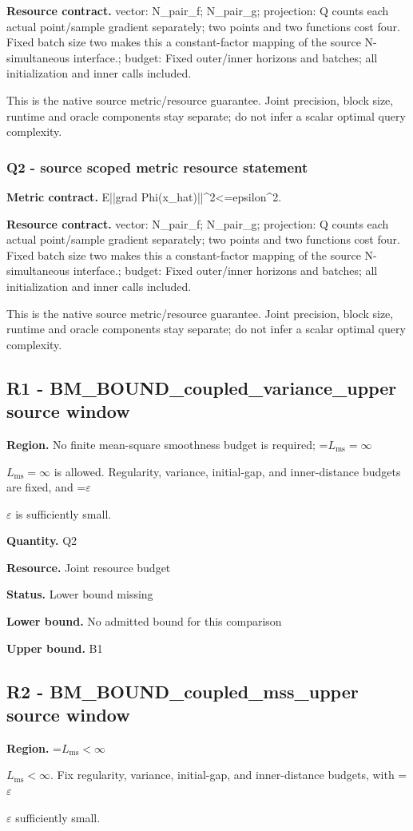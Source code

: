 \documentclass[10pt,a4paper]{article}
\newcommand{\AtlasMath}[1]{\par\begingroup\centering\setbox0=\hbox{$\displaystyle #1$}\ifdim\wd0>1.4\linewidth\typeout{ATLAS WIDE FORMULA: \the\wd0}\fi\ifdim\wd0>\linewidth\resizebox{\linewidth}{!}{\box0}\else\box0\fi\par\endgroup}
\newcommand{\AtlasInlineMath}[1]{\begingroup\setbox0=\hbox{$#1$}\ifdim\wd0>.4\linewidth\endgroup\AtlasMath{#1}\else\endgroup$#1$\fi}
\begin{document}
\textbf{Resource contract.} vector: N\_pair\_f; N\_pair\_g; projection: Q counts each actual point/sample gradient separately; two points and two functions cost four. Fixed batch size two makes this a constant-factor mapping of the source N-simultaneous interface.; budget: Fixed outer/inner horizons and batches; all initialization and inner calls included.

This is the native source metric/resource guarantee. Joint precision, block size, runtime and oracle components stay separate; do not infer a scalar optimal query complexity.

\subsubsection{Q2 - source scoped metric resource statement}
\textbf{Metric contract.} E||grad Phi(x\_hat)||\textasciicircum{}2<=epsilon\textasciicircum{}2.

\textbf{Resource contract.} vector: N\_pair\_f; N\_pair\_g; projection: Q counts each actual point/sample gradient separately; two points and two functions cost four. Fixed batch size two makes this a constant-factor mapping of the source N-simultaneous interface.; budget: Fixed outer/inner horizons and batches; all initialization and inner calls included.

This is the native source metric/resource guarantee. Joint precision, block size, runtime and oracle components stay separate; do not infer a scalar optimal query complexity.

\subsection{R1 - BM\_BOUND\_coupled\_variance\_upper source window}
\textbf{Region.} No finite mean-square smoothness budget is required; \AtlasInlineMath{L_{\mathrm{ms}}=\infty} is allowed. Regularity, variance, initial-gap, and inner-distance budgets are fixed, and \AtlasInlineMath{\varepsilon} is sufficiently small.

\textbf{Quantity.} Q2

\textbf{Resource.} Joint resource budget

\textbf{Status.} Lower bound missing

\textbf{Lower bound.} No admitted bound for this comparison

\textbf{Upper bound.} B1

\subsection{R2 - BM\_BOUND\_coupled\_mss\_upper source window}
\textbf{Region.} \AtlasInlineMath{L_{\mathrm{ms}}<\infty}. Fix regularity, variance, initial-gap, and inner-distance budgets, with \AtlasInlineMath{\varepsilon} sufficiently small.
\end{document}
